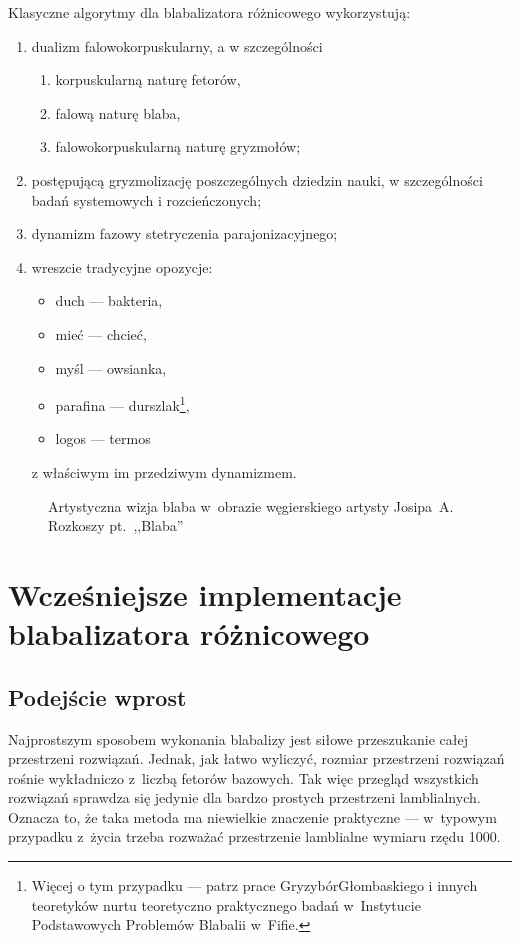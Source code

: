 \documentclass{wmiibook}
\begin{document}
Klasyczne algorytmy dla blabalizatora różnicowego wykorzystują:
\begin{enumerate}
\item dualizm falowo\dywiz korpuskularny, a w szczególności
  \begin{enumerate}
  \item korpuskularną naturę fetorów,
  \item falową naturę blaba,
  \item falowo\dywiz korpuskularną naturę gryzmołów;
  \end{enumerate}
\item postępującą gryzmolizację poszczególnych dziedzin nauki, w szczególności
  badań systemowych i rozcieńczonych;
\item dynamizm fazowy stetryczenia parajonizacyjnego;
\item wreszcie tradycyjne opozycje:
  \begin{itemize}
  \item duch --- bakteria,
  \item mieć --- chcieć,
  \item myśl --- owsianka,
  \item parafina --- durszlak\footnote{Więcej o tym przypadku --- patrz prace
    Gryzybór\dywiz Głombaskiego i innych teoretyków nurtu teoretyczno\dywiz
    praktycznego badań w~Instytucie Podstawowych Problemów Blabalii w~Fifie.},
  \item logos --- termos%
  \end{itemize}
  z właściwym im przedziwym dynamizmem.
\end{enumerate}

\begin{figure}[tp]
  \centering {}
  \caption{Artystyczna wizja blaba w~obrazie węgierskiego artysty
    Josipa~A. Rozkoszy pt.~,,Blaba''}
\end{figure}

\chapter{Wcześniejsze implementacje blabalizatora
  różnicowego}\label{r:losers}

\section{Podejście wprost}

Najprostszym sposobem wykonania blabalizy jest siłowe przeszukanie całej
przestrzeni rozwiązań.  Jednak, jak łatwo wyliczyć, rozmiar przestrzeni
rozwiązań rośnie wykładniczo z~liczbą fetorów bazowych.  Tak więc przegląd
wszystkich rozwiązań sprawdza się jedynie dla bardzo prostych przestrzeni
lamblialnych.  Oznacza to, że taka metoda ma niewielkie znaczenie praktyczne ---
w~typowym przypadku z~życia trzeba rozważać przestrzenie lamblialne wymiaru
rzędu 1000.
\end{document}
